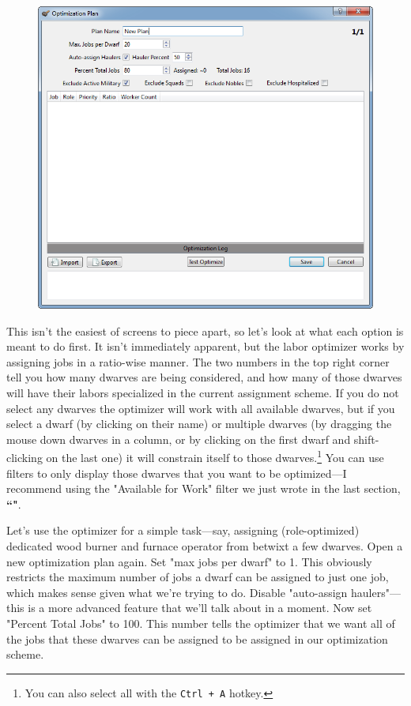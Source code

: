 \documentclass[]{article}
\begin{document}
\begin{figure}[h!]
\centering
\includegraphics[width=\linewidth]{Sec4Fig5}
\end{figure}

This isn't the easiest of screens to piece apart, so let's look at what each option is meant to do first.
It isn't immediately apparent, but the labor optimizer works by assigning jobs in a ratio-wise manner.
The two numbers in the top right corner tell you how many dwarves are being considered, and how many of
those dwarves will have their labors specialized in the current assignment scheme. If you do not select
any dwarves the optimizer will work with all available dwarves, but if you select a dwarf (by clicking on
their name) or multiple dwarves (by dragging the mouse down dwarves in a column, or by clicking on
the first dwarf and shift-clicking on the last one) it will constrain itself to those
dwarves.\footnote{You can also select all with the \texttt{Ctrl + A} hotkey.} You can use filters to
only display those dwarves that you want to be optimized---I recommend using the "Available for Work"
filter we just wrote in the last section, \textbf{``"}.

Let's use the optimizer for a simple task---say, assigning  (role-optimized) dedicated wood burner and
furnace operator from betwixt a few dwarves. Open a new optimization plan again. Set "max jobs per dwarf"
to 1. This obviously restricts the maximum number of jobs a dwarf can be assigned to just one job, which
makes sense given what we're trying to do. Disable "auto-assign haulers"---this is a more advanced
feature that we'll talk about in a moment. Now set "Percent Total Jobs" to 100. This number tells the
optimizer that we want all of the jobs that these dwarves can be assigned to be assigned in our
optimization scheme.
\end{document}
